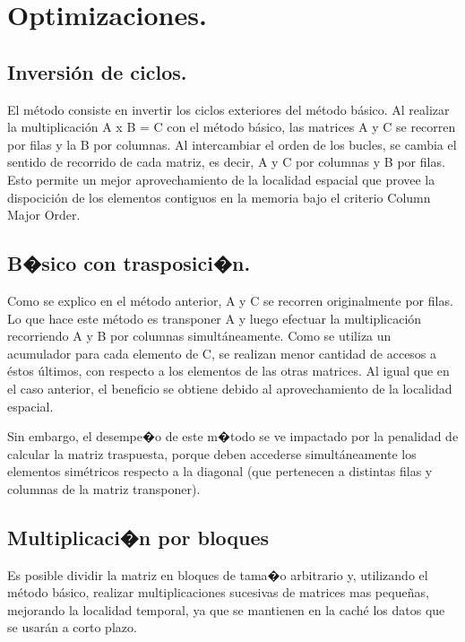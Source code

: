 \documentclass{article}
\begin{document}
\section{Optimizaciones.}

\subsection{Inversión de ciclos.}

El método consiste en invertir los ciclos exteriores del método básico. Al realizar la multiplicación A x B = C con el método básico, las matrices A y C se recorren por filas y la B por columnas.
Al intercambiar el orden de los bucles, se cambia el sentido de recorrido de cada matriz, es decir, A y C por columnas y B por filas. Esto permite un mejor aprovechamiento de la localidad espacial que provee la dispocición de los elementos contiguos en la memoria bajo el criterio Column Major Order.


\subsection{B�sico con trasposici�n.}

Como se explico en el método anterior, A y C se recorren originalmente por filas. Lo que hace este método es transponer A y luego efectuar la multiplicación recorriendo A y B por columnas simultáneamente. Como se utiliza un acumulador para cada elemento de C, se realizan menor cantidad de accesos a éstos últimos, con respecto a los elementos de las otras matrices. Al igual que en el caso anterior, el beneficio se obtiene debido al aprovechamiento de la localidad espacial.

Sin embargo, el desempe�o de este m�todo se ve impactado por la penalidad de calcular la matriz traspuesta, porque deben accederse simultáneamente los elementos simétricos respecto a la diagonal (que pertenecen a distintas filas y columnas de la matriz transponer).

\subsection{Multiplicaci�n por bloques}

Es posible dividir la matriz en bloques de tama�o arbitrario y, utilizando el método básico, realizar multiplicaciones sucesivas de matrices mas pequeñas, mejorando la localidad temporal, ya que se mantienen en la caché los datos que se usarán a corto plazo.
\end{document}
